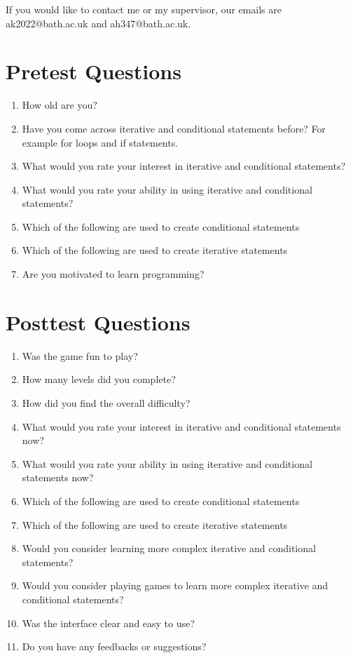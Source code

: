 \documentclass[a4paper,11.5pt]{report}
\numberwithin{figure}{section}
\numberwithin{table}{section}
\numberwithin{equation}{section}
\numberwithin{equation}{section}
\begin{document}
If you would like to contact me or my supervisor, our emails are ak2022@bath.ac.uk and ah347@bath.ac.uk. 

\section{Pretest Questions}

\begin{enumerate}
	
	\item How old are you?
	\item Have you come across iterative and conditional statements before? For example for loops and if statements.
	\item What would you rate your interest in iterative and conditional statements?
	\item What would you rate your ability in using iterative and conditional statements?
	\item Which of the following are used to create conditional statements
	\item Which of the following are used to create iterative statements
	\item Are you motivated to learn programming?

\end{enumerate}

\section{Posttest Questions}

\begin{enumerate}
	
	\item Was the game fun to play?
	\item How many levels did you complete?
	\item How did you find the overall difficulty?
	\item What would you rate your interest in iterative and conditional statements now?
	\item What would you rate your ability in using iterative and conditional statements now?
	\item Which of the following are used to create conditional statements
	\item Which of the following are used to create iterative statements
	\item Would you consider learning more complex iterative and conditional statements?
	\item Would you consider playing games to learn more complex iterative and conditional statements?
	\item Was the interface clear and easy to use?
	\item Do you have any feedbacks or suggestions?
	

\end{enumerate}
\end{document}
